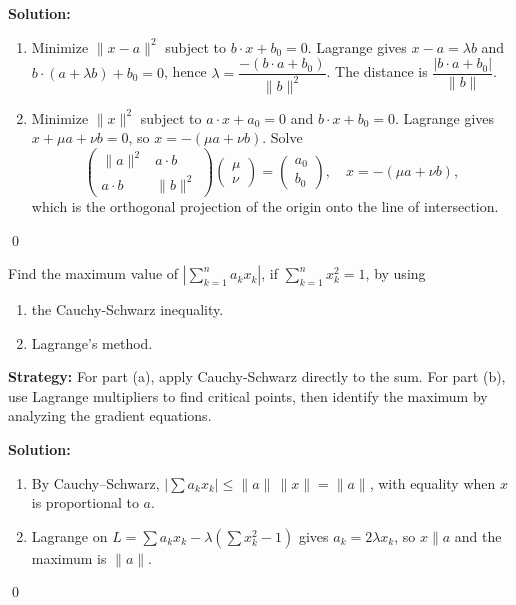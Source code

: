 \bigskip\noindent\textbf{Solution:}
\begin{enumerate}[label=(\alph*)]
    \item Minimize $\|x-a\|^2$ subject to $b\cdot x+b_0=0$. Lagrange gives $x-a=\lambda b$ and $b\cdot(a+\lambda b)+b_0=0$, hence $\lambda=\dfrac{-(b\cdot a+b_0)}{\|b\|^2}$. The distance is $\dfrac{|b\cdot a+b_0|}{\|b\|}$.
    \item Minimize $\|x\|^2$ subject to $a\cdot x+a_0=0$ and $b\cdot x+b_0=0$. Lagrange gives $x+\mu a+\nu b=0$, so $x=-(\mu a+\nu b)$. Solve
    \[\begin{pmatrix}\|a\|^2 & a\cdot b\\ a\cdot b & \|b\|^2\end{pmatrix}\begin{pmatrix}\mu\\ \nu\end{pmatrix}=\begin{pmatrix}a_0\\ b_0\end{pmatrix},\quad x=-(\mu a+\nu b),\]
    which is the orthogonal projection of the origin onto the line of intersection.
\end{enumerate}\qed


\begin{problembox}
\begin{problemstatement}
Find the maximum value of \(| \sum_{k=1}^n a_k x_k |\), if \(\sum_{k=1}^n x_k^2 = 1\), by using 
\begin{enumerate}[label=(\alph*)]
    \item the Cauchy-Schwarz inequality.
    \item Lagrange's method.
\end{enumerate}
\end{problemstatement}
\end{problembox}

\noindent\textbf{Strategy:} For part (a), apply Cauchy-Schwarz directly to the sum. For part (b), use Lagrange multipliers to find critical points, then identify the maximum by analyzing the gradient equations.

\bigskip\noindent\textbf{Solution:}
\begin{enumerate}[label=(\alph*)]
    \item By Cauchy--Schwarz, $\big|\sum a_k x_k\big|\le \|a\|\,\|x\|=\|a\|$, with equality when $x$ is proportional to $a$.
    \item Lagrange on $L=\sum a_k x_k-\lambda(\sum x_k^2-1)$ gives $a_k=2\lambda x_k$, so $x\parallel a$ and the maximum is $\|a\|$.
\end{enumerate}\qed


